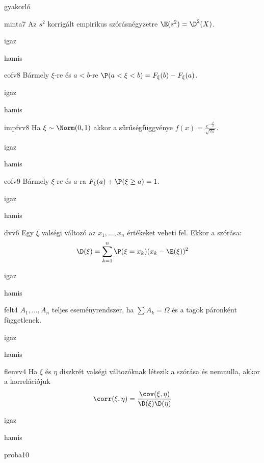 \documentclass[12pt]{article}
\begin{document}
\begin{quiz}{gyakorló}
\begin{multi}[feedback={Az $s^2$ torzítatlan becslése a sokasági (elméleti) szórásnégyzetnek}]{minta7}
Az $s^2$ korrigált empirikus szórásnégyzetre $\E(s^2)=\D^2(X)$.
\item* igaz
\item hamis
\end{multi}
\begin{multi}[feedback={Diszkrét v.v.-ra ez nem feltétlen igaz, ha $a$-t pozitív valséggel felveszi.}]{eofv8}
Bármely $\xi$-re és $a<b$-re $\P(a< \xi <b)=F_{\xi}(b)-F_{\xi}(a)$.
\item igaz
\item* hamis
\end{multi}
\begin{multi}[feedback={Def.}]{impfvv8}
Ha $\xi\sim \Norm(0,1)$ akkor a sűrűségfüggvénye $f(x)=\frac{e^{-\frac{x^2}{2}}}{\sqrt{2\pi}}$.
\item* igaz
\item hamis
\end{multi}
\begin{multi}[feedback={Komplementer események.}]{eofv9}
Bármely $\xi$-re és $a$-ra $F_{\xi}(a)+\P(\xi\ge a)=1$.
\item* igaz
\item hamis
\end{multi}
\begin{multi}[feedback={Def.}]{dvv6}
Egy $\xi$ valségi változó az $x_1,\ldots, x_n$ értékeket veheti fel. Ekkor a szórása:
$$
\D(\xi)=\sum_{k=1}^n \P(\xi=x_k)(x_k-\E(\xi))^2
$$
\item igaz
\item* hamis
\end{multi}
\begin{multi}[feedback={Def.}]{felt4}
$A_1,\ldots,A_n$ teljes eseményrendszer, ha $\sum A_k=\Omega$ és a tagok páronként függetlenek.
\item igaz
\item* hamis
\end{multi}
\begin{multi}[feedback={Def.}]{flenvv4}
Ha $\xi$ és $\eta$ diszkrét valségi változóknak létezik a szórása és nemnulla, akkor a 
korrelációjuk
$$
\corr(\xi,\eta)=\frac{\cov(\xi,\eta)}{\D(\xi)\D(\eta)}
$$
\item* igaz
\item hamis
\end{multi}
\begin{multi}[feedback={A feltételek mellett a fenti mennyiség sztenderd normális, ha $H_0$ igaz.}]{proba10}

\end{multi}
\end{quiz}
\end{document}
